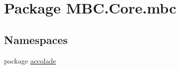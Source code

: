 \hypertarget{namespace_m_b_c_1_1_core_1_1mbc}{\section{Package M\-B\-C.\-Core.\-mbc}
\label{namespace_m_b_c_1_1_core_1_1mbc}
}
\subsection*{Namespaces}
\begin{DoxyCompactItemize}
\item 
package \hyperlink{namespace_m_b_c_1_1_core_1_1mbc_1_1accolade}{accolade}
\end{DoxyCompactItemize}
